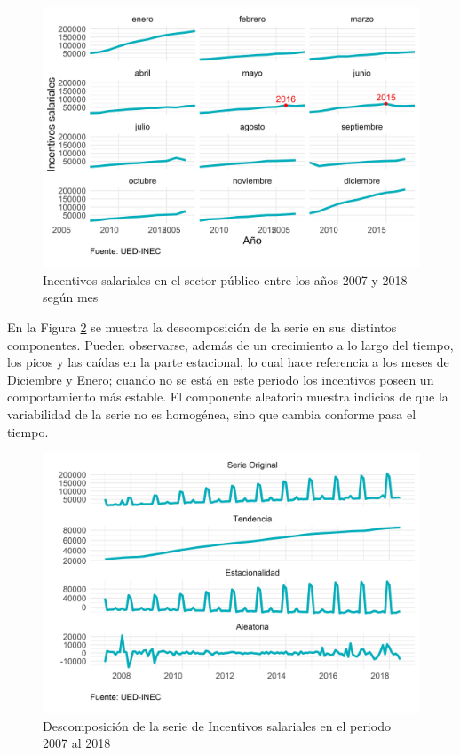 \documentclass[
]{article}
\begin{document}
\begin{figure}[H]
\includegraphics[width=1\linewidth,height=1\textheight]{Tesis_files/figure-latex/incentivosplotperiodos-1} \caption{Incentivos salariales en el sector público entre los años 2007 y 2018 según mes}\label{fig:incentivosplotperiodos}
\end{figure}

En la Figura \ref{fig:incentivosplotdescomposicion} se muestra la
descomposición de la serie en sus distintos componentes. Pueden
observarse, además de un crecimiento a lo largo del tiempo, los picos y
las caídas en la parte estacional, lo cual hace referencia a los meses
de Diciembre y Enero; cuando no se está en este periodo los incentivos
poseen un comportamiento más estable. El componente aleatorio muestra
indicios de que la variabilidad de la serie no es homogénea, sino que
cambia conforme pasa el tiempo.

\begin{figure}[H]
\includegraphics[width=1\linewidth,height=1\textheight]{Tesis_files/figure-latex/incentivosplotdescomposicion-1} \caption{Descomposición de la serie de Incentivos salariales en el periodo 2007 al 2018}\label{fig:incentivosplotdescomposicion}
\end{figure}
\end{document}
